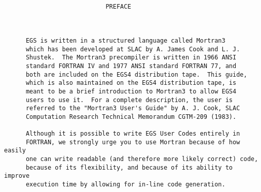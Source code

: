 \newpage \begin{verbatim}


                            PREFACE



      EGS is written in a structured language called Mortran3
      which has been developed at SLAC by A. James Cook and L. J.
      Shustek.  The Mortran3 precompiler is written in 1966 ANSI
      standard FORTRAN IV and 1977 ANSI standard FORTRAN 77, and
      both are included on the EGS4 distribution tape.  This guide,
      which is also maintained on the EGS4 distribution tape, is
      meant to be a brief introduction to Mortran3 to allow EGS4
      users to use it.  For a complete description, the user is
      referred to the "Mortran3 User's Guide" by A. J. Cook, SLAC
      Computation Research Technical Memorandum CGTM-209 (1983).

      Although it is possible to write EGS User Codes entirely in
      FORTRAN, we strongly urge you to use Mortran because of how easily
      one can write readable (and therefore more likely correct) code,
      because of its flexibility, and because of its ability to improve
      execution time by allowing for in-line code generation.


















\end{verbatim}

\newpage
